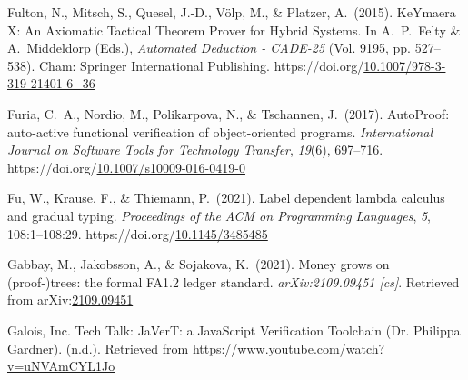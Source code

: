 \documentclass[12pt,twoside]{article}
\begin{document}
{\begin{thebibliography}{1079}
\mdbibitemlabel{}Fulton, N., Mitsch, S., Quesel, J.-D., Völp, M., \& Platzer, A.~(2015). KeYmaera X: An Axiomatic Tactical Theorem Prover for Hybrid Systems. In A.~P.~Felty \& A.~Middeldorp (Eds.), \emph{Automated Deduction - CADE-25} (Vol. 9195, pp. 527–538). Cham: Springer International Publishing. https://doi.org/\href{https://dx.doi.org/10.1007/978-3-319-21401-6_36}{10.1007/978-3-319-21401-6\_36}%

\mdbibitemlabel{}Furia, C.~A., Nordio, M., Polikarpova, N., \& Tschannen, J.~(2017). AutoProof: auto-active functional verification of object-oriented programs. \emph{International Journal on Software Tools for Technology Transfer}, \emph{19}(6), 697–716. https://doi.org/\href{https://dx.doi.org/10.1007/s10009-016-0419-0}{10.1007/s10009-016-0419-0}%

\mdbibitemlabel{}Fu, W., Krause, F., \& Thiemann, P.~(2021). Label dependent lambda calculus and gradual typing. \emph{Proceedings of the ACM on Programming Languages}, \emph{5}, 108:1–108:29. https://doi.org/\href{https://dx.doi.org/10.1145/3485485}{10.1145/3485485}%

\mdbibitemlabel{}Gabbay, M., Jakobsson, A., \& Sojakova, K.~(2021). Money grows on (proof-)trees: the formal FA1.2 ledger standard. \emph{arXiv:2109.09451 {}[cs]}. Retrieved from arXiv:\href{http://arxiv.org/abs/2109.09451}{2109.09451}%

\mdbibitemlabel{}Galois, Inc. Tech Talk: JaVerT: a JavaScript Verification Toolchain (Dr. Philippa Gardner). (n.d.). Retrieved from \href{https://www.youtube.com/watch?v=uNVAmCYL1Jo}{{\ttfamily https://\hspace{0pt}www.\hspace{0pt}youtube.\hspace{0pt}com/\hspace{0pt}watch?\hspace{0pt}v=\hspace{0pt}uNVAmCYL1Jo}}%


\end{thebibliography}}
\end{document}
